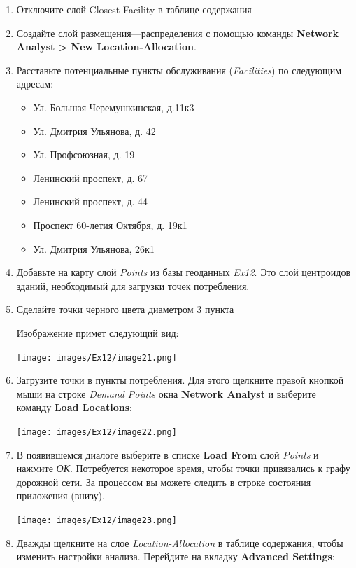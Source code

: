 \documentclass[12pt,]{book}
\begin{document}
\begin{enumerate}
\def\labelenumi{\arabic{enumi}.}
\item
  Отключите слой Closest Facility в таблице содержания
\item
  Создайте слой размещения---распределения с помощью команды \textbf{Network Analyst \textgreater{} New Location-Allocation}.
\item
  Расставьте потенциальные пункты обслуживания (\emph{Facilities}) по
  следующим адресам:

  \begin{itemize}
  \item
    Ул. Большая Черемушкинская, д.11к3
  \item
    Ул. Дмитрия Ульянова, д. 42
  \item
    Ул. Профсоюзная, д. 19
  \item
    Ленинский проспект, д. 67
  \item
    Ленинский проспект, д. 44
  \item
    Проспект 60-летия Октября, д. 19к1
  \item
    Ул. Дмитрия Ульянова, 26к1
  \end{itemize}
\item
  Добавьте на карту слой \emph{Points} из базы геоданных \emph{Ex12}. Это слой центроидов зданий, необходимый для загрузки точек потребления.
\item
  Сделайте точки черного цвета диаметром 3 пункта

  Изображение примет следующий вид:

  \texttt{[image: images/Ex12/image21.png]}
\item
  Загрузите точки в пункты потребления. Для этого щелкните правой кнопкой мыши на строке \emph{Demand Points} окна \textbf{Network Analyst} и выберите команду \textbf{Load Locations}:

  \texttt{[image: images/Ex12/image22.png]}
\item
  В появившемся диалоге выберите в списке \textbf{Load From} слой \emph{Points} и нажмите \emph{ОК}. Потребуется некоторое время, чтобы точки привязались к графу дорожной сети. За процессом вы можете следить в строке состояния приложения (внизу).

  \texttt{[image: images/Ex12/image23.png]}
\item
  Дважды щелкните на слое \emph{Location-Allocation} в таблице содержания, чтобы изменить настройки анализа. Перейдите на вкладку \textbf{Advanced Settings}:


\end{enumerate}
\end{document}
